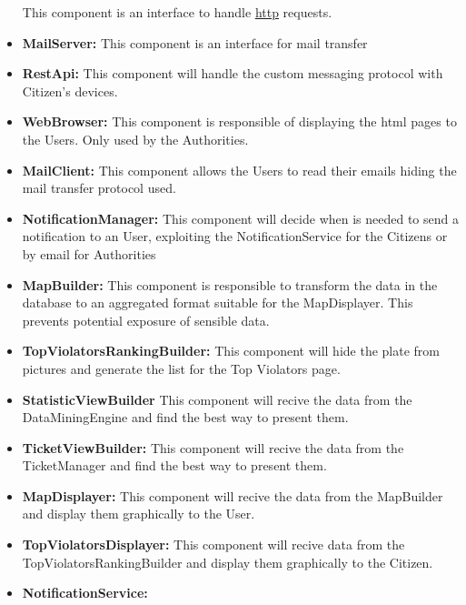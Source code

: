 \documentclass{article}
\newcommand{\link}[2]{{\color{blue}\underline{\href{#1}{#2}}}}
\begin{document}
\begin{itemize}
		 	This component is an interface to handle \link{https://en.wikipedia.org/wiki/Hypertext_Transfer_Protocol}{http} requests.
		 \item \label{component:MailServer} \textbf{MailServer:} 
		 	This component is an interface for mail transfer
		 \item \label{component:RestApi} \textbf{RestApi:} 
		 	This component will handle the custom messaging protocol with Citizen's devices.
		 \item \label{component:WebBrowser} \textbf{WebBrowser:}
		 	This component is responsible of displaying the html pages to the Users. Only used by the Authorities.
		 \item \label{component:MailClient} \textbf{MailClient:}
		 	This component allows the Users to read their emails hiding the mail transfer protocol used.
		 \item \label{component:NotificationManager} \textbf{NotificationManager:}
		 	This component will decide when is needed to send a notification to an User, exploiting the NotificationService for the Citizens
		 	or by email for Authorities
		 \item \label{component:MapBuilder} \textbf{MapBuilder:}
		 	This component is responsible to transform the data in the database to an aggregated format suitable for the MapDisplayer. 
		 	This prevents potential exposure of sensible data.
		 \item \label{component:TopViolatorsRankingBuilder} \textbf{TopViolatorsRankingBuilder:}
		 	This component will hide the plate from pictures and generate the list for the Top Violators page.
		 \item \label{component:StatisticViewBuilder} \textbf{StatisticViewBuilder}
		 	This component will recive the data from the DataMiningEngine and find the best way to present them.
		 \item \label{component:TicketViewBuilder} \textbf{TicketViewBuilder:}
		 	This component will recive the data from the TicketManager and find the best way to present them.
		 \item \label{component:MapDisplayer} \textbf{MapDisplayer:}
		 	This component will recive the data from the MapBuilder and display them graphically to the User.
		 \item \label{component:TopViolatorsDisplayer} \textbf{TopViolatorsDisplayer:}
		 	This component will recive data from the TopViolatorsRankingBuilder and display them graphically to the Citizen.
		 \item \label{component:NotificationService} \textbf{NotificationService:}

\end{itemize}
\end{document}
